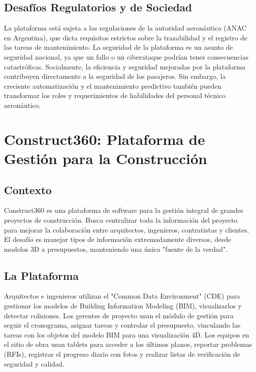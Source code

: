 \documentclass[12pt]{article}
\begin{document}
\subsection{Desafíos Regulatorios y de Sociedad}
La plataforma está sujeta a las regulaciones de la autoridad aeronáutica (ANAC en Argentina), que dicta requisitos estrictos sobre la trazabilidad y el registro de las tareas de mantenimiento. La seguridad de la plataforma es un asunto de seguridad nacional, ya que un fallo o un ciberataque podrían tener consecuencias catastróficas. Socialmente, la eficiencia y seguridad mejoradas por la plataforma contribuyen directamente a la seguridad de los pasajeros. Sin embargo, la creciente automatización y el mantenimiento predictivo también pueden transformar los roles y requerimientos de habilidades del personal técnico aeronáutico.

\newpage

\section{Construct360: Plataforma de Gestión para la Construcción}

\subsection{Contexto}
Construct360 es una plataforma de software para la gestión integral de grandes proyectos de construcción. Busca centralizar toda la información del proyecto para mejorar la colaboración entre arquitectos, ingenieros, contratistas y clientes. El desafío es manejar tipos de información extremadamente diversos, desde modelos 3D a presupuestos, manteniendo una única "fuente de la verdad".

\subsection{La Plataforma}
Arquitectos e ingenieros utilizan el "Common Data Environment" (CDE) para gestionar los modelos de Building Information Modeling (BIM), visualizarlos y detectar colisiones. Los gerentes de proyecto usan el módulo de gestión para seguir el cronograma, asignar tareas y controlar el presupuesto, vinculando las tareas con los objetos del modelo BIM para una visualización 4D. Los equipos en el sitio de obra usan tablets para acceder a los últimos planos, reportar problemas (RFIs), registrar el progreso diario con fotos y realizar listas de verificación de seguridad y calidad.
\end{document}
